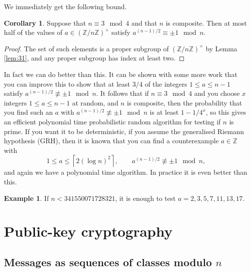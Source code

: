 \documentclass{article}
\newcommand{\Z}{\mathbb{Z}}
\newcommand{\rb}[1]{\left( #1 \right)}
\newcommand{\unit}[1]{\rb{\Z / #1\Z}^\times}
\theoremstyle{definition}\newtheorem{definition}{Definition}
\theoremstyle{definition}\newtheorem*{remark}{Remark}
\theoremstyle{definition}\newtheorem*{example}{Example}
\theoremstyle{definition}\newtheorem*{note}{Note}
\newtheorem{corollary}[definition]{Corollary}
\begin{document}
We immediately get the following bound.

\begin{corollary}
Suppose that $ n \equiv 3 \mod 4 $ and that $ n $ is composite. Then at most half of the values of $ a \in \unit{n} $ satisfy $ a^{\rb{n - 1} / 2} \equiv \pm 1 \mod n $.
\end{corollary}

\begin{proof}
The set of such elements is a proper subgroup of $ \unit{n} $ by Lemma \ref{lem:31}, and any proper subgroup has index at least two.
\end{proof}

In fact we can do better than this. It can be shown with some more work that you can improve this to show that at least $ 3 / 4 $ of the integers $ 1 \le a \le n - 1 $ satisfy $ a^{\rb{n - 1} / 2} \not\equiv \pm 1 \mod n $. It follows that if $ n \equiv 3 \mod 4 $ and you choose $ x $ integers $ 1 \le a \le n - 1 $ at random, and $ n $ is composite, then the probability that you find such an $ a $ with $ a^{\rb{n - 1} / 2} \not\equiv \pm 1 \mod n $ is at least $ 1 - 1 / 4^x $, so this gives an efficient polynomial time probabilistic random algorithm for testing if $ n $ is prime. If you want it to be deterministic, if you assume the generalised Riemann hypothesis (GRH), then it is known that you can find a counterexample $ a \in \Z $ with
$$ 1 \le a \le \left\lceil 2 \rb{\log n}^2 \right\rceil, \qquad a^{\rb{n - 1} / 2} \not\equiv \pm 1 \mod n, $$
and again we have a polynomial time algorithm. In practice it is even better than this.

\begin{example}
If $ n < 341550071728321 $, it is enough to test $ a = 2, 3, 5, 7, 11, 13, 17 $.
\end{example}

\section{Public-key cryptography}

\subsection{Messages as sequences of classes modulo $ n $}
\end{document}
